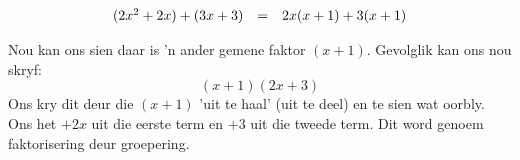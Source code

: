 \begin{equation*}
\begin{array}{ccl}
(2{x}^{2}+2x)+(3x+3) &=& 2x(x+1)+3(x+1) \hfill \hfill
\end{array}
\end{equation*}


Nou kan ons sien daar is ’n ander gemene faktor $(x+1)$. Gevolglik kan ons nou skryf: 
\begin{equation*}
(x+1)(2x+3)
\end{equation*}
Ons kry dit deur die $(x+1)$ ’uit te haal’ (uit te deel) en te sien wat oorbly. Ons het $+2x$ uit die eerste term en $+3$ uit die tweede term. Dit word genoem faktorisering deur groepering.\par 



